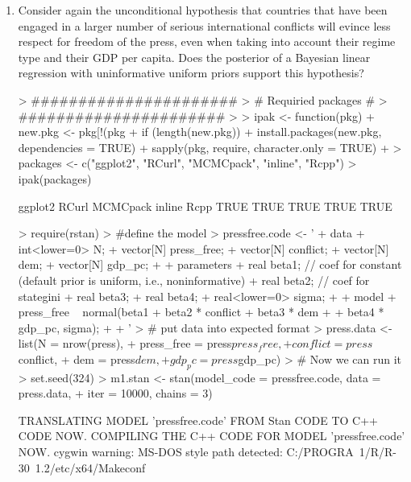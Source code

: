 \documentclass[12pt]{article}
\begin{document}
\begin{enumerate}
\item Consider again the unconditional hypothesis that countries that have been engaged in a larger number of serious international conflicts will evince less respect for freedom of the press, even when taking into account their regime type and their GDP per capita.  Does the posterior of a Bayesian linear regression with uninformative uniform priors support this hypothesis?

\begin{Schunk}
\begin{Sinput}
> ######################
> # Requiried packages #
> ######################
> 
> ipak <- function(pkg){
+     new.pkg <- pkg[!(pkg %
+     if (length(new.pkg)) 
+         install.packages(new.pkg, dependencies = TRUE)
+     sapply(pkg, require, character.only = TRUE)
+ }
> packages <- c("ggplot2", "RCurl", "MCMCpack", "inline", "Rcpp")
> ipak(packages)
\end{Sinput}
\begin{Soutput}
 ggplot2    RCurl MCMCpack   inline     Rcpp 
    TRUE     TRUE     TRUE     TRUE     TRUE 
\end{Soutput}
\begin{Sinput}
> require(rstan)
> #define the model
> pressfree.code <- '
+     data {
+         int<lower=0> N;
+         vector[N] press_free;
+         vector[N] conflict;
+         vector[N] dem;
+         vector[N] gdp_pc;
+     }
+     parameters {                
+         real beta1;             // coef for constant (default prior is uniform, i.e., noninformative)
+         real beta2;             // coef for stategini
+         real beta3;
+         real beta4;
+         real<lower=0> sigma;
+     }
+     model {
+         press_free ~ normal(beta1 + beta2 * conflict + beta3 * dem +
+                              beta4 * gdp_pc, sigma);
+     }
+ '
> # put data into expected format
> press.data <- list(N = nrow(press), 
+                    press_free = press$press_free, 
+                    conflict = press$conflict, 
+                    dem = press$dem, 
+                    gdp_pc = press$gdp_pc)
> # Now we can run it
> set.seed(324)
> m1.stan <- stan(model_code = pressfree.code, data = press.data, 
+                 iter = 10000, chains = 3)
\end{Sinput}
\begin{Soutput}
TRANSLATING MODEL 'pressfree.code' FROM Stan CODE TO C++ CODE NOW.
COMPILING THE C++ CODE FOR MODEL 'pressfree.code' NOW.
cygwin warning:
  MS-DOS style path detected: C:/PROGRA~1/R/R-30~1.2/etc/x64/Makeconf

\end{Soutput}
\end{Schunk}
\end{enumerate}
\end{document}
